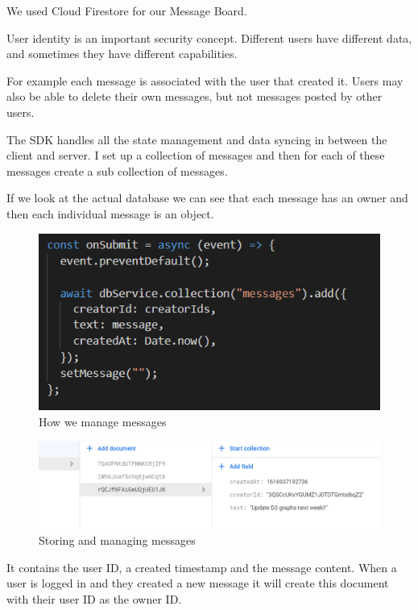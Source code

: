 We used Cloud Firestore for our Message Board.

User identity is an important security concept. Different users have different data, and sometimes they have different capabilities.

For example each message is associated with the user that created it. Users may also be able to delete their own messages, but not messages posted by other users.

The SDK handles all the state management and data syncing in between the client and server. I set up a collection of messages and then for each of these messages create a sub collection of messages.

If we look at the actual database we can see that each message has an owner and then each individual message is an object.

\begin{figure}
    \centering
    \includegraphics[scale=0.75]{img/message.PNG}
    \caption{How we manage messages}
    \label{fig:my_label4}
\end{figure}

\begin{figure}
    \centering
    \includegraphics[scale=0.6]{img/FirestoreMessage.PNG}
    \caption{Storing and managing messages}
    \label{fig:my_label4}
\end{figure}

It contains the user ID, a created timestamp and the message content.
When a user is logged in and they created a new message it will create this document with their user ID as the owner ID.

